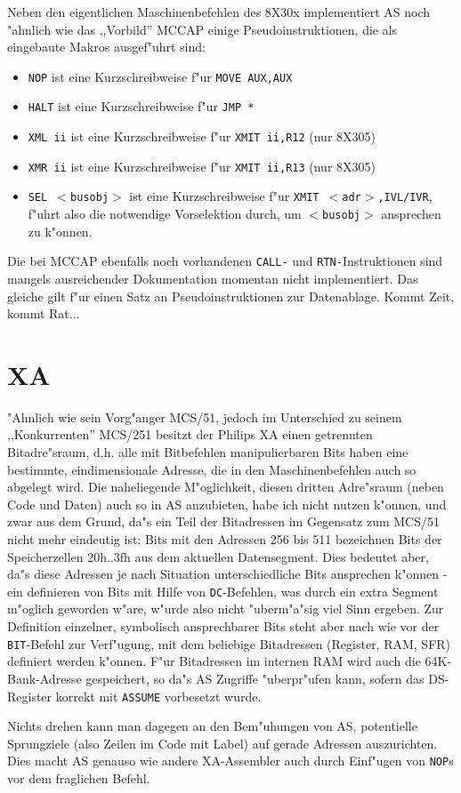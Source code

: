 \documentclass[12pt,a4paper,twoside]{report}
\newcommand{\tty}[1]{{\tt #1}}
\begin{document}
{Neben den eigentlichen Maschinenbefehlen des 8X30x implementiert AS
noch "ahnlich wie das ,,Vorbild'' MCCAP einige Pseudoinstruktionen, die
als eingebaute Makros ausgef"uhrt sind:
\begin{itemize}
\item{\tty{NOP} ist eine Kurzschreibweise f"ur \tty{MOVE AUX,AUX}}
\item{\tty{HALT} ist eine Kurzschreibweise f"ur {\tt JMP \verb!*!}}
\item{\tty{XML ii} ist eine Kurzschreibweise f"ur \tty{XMIT ii,R12} (nur
      8X305)}
\item{\tty{XMR ii} ist eine Kurzschreibweise f"ur \tty{XMIT ii,R13} (nur
      8X305)}
\item{\tty{SEL $<$busobj$>$} ist eine Kurzschreibweise f"ur
      \tty{XMIT $<$adr$>$,IVL/IVR}, f"uhrt also die notwendige Vorselektion
      durch, um \tty{$<$busobj$>$} ansprechen zu k"onnen.}
\end{itemize}
Die bei MCCAP ebenfalls noch vorhandenen \tty{CALL-} und
\tty{RTN-}Instruktionen sind mangels ausreichender Dokumentation momentan
nicht implementiert. Das gleiche gilt f"ur einen Satz an
Pseudoinstruktionen zur Datenablage. Kommt Zeit, kommt Rat...


\section{XA}

"Ahnlich wie sein Vorg"anger MCS/51, jedoch im Unterschied zu seinem
,,Konkurrenten'' MCS/251 besitzt der Philips XA einen getrennten Bitadre"sraum,
d.h. alle mit Bitbefehlen manipulierbaren Bits haben eine
bestimmte, eindimensionale Adresse, die in den Maschinenbefehlen auch
so abgelegt wird.  Die naheliegende M"oglichkeit, diesen dritten
Adre"sraum (neben Code und Daten) auch so in AS anzubieten, habe ich
nicht nutzen k"onnen, und zwar aus dem Grund, da"s ein Teil der Bitadressen
im Gegensatz zum MCS/51 nicht mehr eindeutig ist: Bits mit
den Adressen 256 bis 511 bezeichnen Bits der Speicherzellen 20h..3fh
aus dem aktuellen Datensegment.  Dies bedeutet aber, da"s diese Adressen
je nach Situation unterschiedliche Bits ansprechen k"onnen - ein definieren
von Bits mit Hilfe von \tty{DC}-Befehlen, was durch ein extra Segment
m"oglich geworden w"are, w"urde also nicht "uberm"a"sig viel Sinn ergeben.
Zur Definition einzelner, symbolisch ansprechbarer Bits steht aber 
nach wie vor der \tty{BIT}-Befehl zur Verf"ugung, mit dem beliebige Bitadressen
(Register, RAM, SFR) definiert werden k"onnen.  F"ur Bitadressen im
internen RAM wird auch die 64K-Bank-Adresse gespeichert, so da"s AS
Zugriffe "uberpr"ufen kann, sofern das DS-Register korrekt mit \tty{ASSUME}
vorbesetzt wurde.
\par
Nichts drehen kann man dagegen an den Bem"uhungen von AS, potentielle
Sprungziele (also Zeilen im Code mit Label) auf gerade Adressen
auszurichten.  Dies macht AS genauso wie andere XA-Assembler auch durch
Einf"ugen von \tty{NOP}s vor dem fraglichen Befehl.  

}
\end{document}

